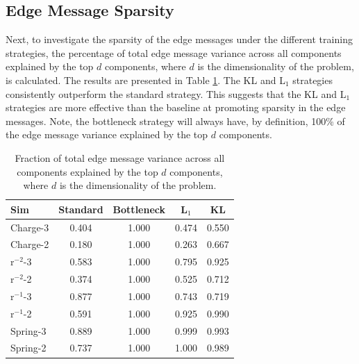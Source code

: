 \documentclass[11pt]{article}
\begin{document}
    \subsection{Edge Message Sparsity}
    Next, to investigate the sparsity of the edge messages under the different training strategies, the percentage of total edge message variance across all components explained by the top $d$ components, where $d$ is the dimensionality of the problem, is calculated. The results are presented in Table \ref{tab:scarcity}. The KL and L$_1$ strategies consistently outperform the standard strategy. This suggests that the KL and L$_1$ strategies are more effective than the baseline at promoting sparsity in the edge messages. Note, the bottleneck strategy will always have, by definition, 100\% of the edge message variance explained by the top $d$ components.
    \begin{table}[H]
        \centering
        \begin{tabular}{lcccc}
        \hline
        Sim & Standard & Bottleneck & L$_1$ & KL \\
        \hline
        Charge-3 & 0.404 & 1.000 & 0.474 & 0.550 \\
        Charge-2 & 0.180 & 1.000 & 0.263 & 0.667 \\
        r$^{-2}$-3 & 0.583 & 1.000 & 0.795 & 0.925 \\
        r$^{-2}$-2 & 0.374 & 1.000 & 0.525 & 0.712 \\
        r$^{-1}$-3 & 0.877 & 1.000 & 0.743 & 0.719 \\
        r$^{-1}$-2 & 0.591 & 1.000 & 0.925 & 0.990 \\
        Spring-3 & 0.889 & 1.000 & 0.999  & 0.993 \\
        Spring-2 & 0.737 & 1.000 & 1.000 & 0.989 \\
        \hline
        \end{tabular}
        \caption{Fraction of total edge message variance across all components explained by the top $d$ components, where $d$ is the dimensionality of the problem.}
        \label{tab:scarcity}
    \end{table}
\end{document}
